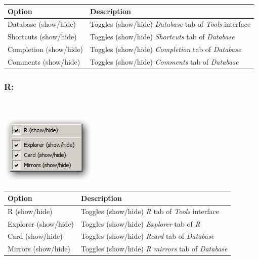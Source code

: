 \begin{scriptsize}\begin{tabularx}{\textwidth}{>{\hsize=0.3\hsize}X>{\hsize=0.7\hsize}X}\\
    \hline
    \textbf{Option} & \textbf{Description} \\
    \hline
    Database (show/hide) & Toggles (show/hide) \textit{Database} tab of \textit{Tools} interface \\
    Shortcuts (show/hide) & Toggles (show/hide) \textit{Shortcuts} tab of \textit{Database} \\
    Completion (show/hide) & Toggles (show/hide) \textit{Completion} tab of \textit{Database} \\
    Comments (show/hide) & Toggles (show/hide) \textit{Comments} tab of \textit{Database} \\
    \hline
  \end{tabularx}\end{scriptsize}


\hypertarget{menu_view_tools_resources_r}{}
\subsubsection{R:}\\

\includegraphics[scale=0.50]{./res/menu_view_tools_resources_r.png}\\

\begin{scriptsize}\begin{tabularx}{\textwidth}{>{\hsize=0.3\hsize}X>{\hsize=0.7\hsize}X}\\
    \hline
    \textbf{Option} & \textbf{Description} \\
    \hline
    R (show/hide) & Toggles (show/hide) \textit{R} tab of \textit{Tools} interface \\
    Explorer (show/hide) & Toggles (show/hide) \textit{Explorer} tab of \textit{R} \\
    Card (show/hide) & Toggles (show/hide) \textit{Rcard} tab of \textit{Database} \\
    Mirrors (show/hide) & Toggles (show/hide) \textit{R mirrors} tab of \textit{Database} \\
    \hline
  \end{tabularx}\end{scriptsize}


